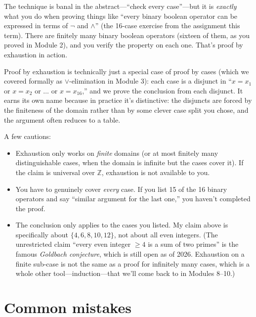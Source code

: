 \documentclass[11pt]{article}
\begin{document}
The technique is banal in the abstract---``check every case''---but it is \emph{exactly} what you do when proving things like ``every binary boolean operator can be expressed in terms of $\lnot$ and $\wedge$'' (the 16-case exercise from the assignment this term). There are finitely many binary boolean operators (sixteen of them, as you proved in Module 2), and you verify the property on each one. That's proof by exhaustion in action.

Proof by exhaustion is technically just a special case of proof by cases (which we covered formally as $\vee$-elimination in Module 3): each case is a disjunct in ``$x = x_1$ or $x = x_2$ or $\ldots$ or $x = x_{16}$,'' and we prove the conclusion from each disjunct. It earns its own name because in practice it's distinctive: the disjuncts are forced by the finiteness of the domain rather than by some clever case split you chose, and the argument often reduces to a table.

A few cautions:
\begin{itemize}
  \item Exhaustion only works on \emph{finite} domains (or at most finitely many distinguishable cases, when the domain is infinite but the cases cover it). If the claim is universal over $\mathbb{Z}$, exhaustion is not available to you.
  \item You have to genuinely cover \emph{every} case. If you list 15 of the 16 binary operators and say ``similar argument for the last one,'' you haven't completed the proof.
  \item The conclusion only applies to the cases you listed. My claim above is specifically about $\{4, 6, 8, 10, 12\}$, not about all even integers. (The unrestricted claim ``every even integer $\geq 4$ is a sum of two primes'' is the famous \emph{Goldbach conjecture}, which is still open as of 2026. Exhaustion on a finite sub-case is not the same as a proof for infinitely many cases, which is a whole other tool---induction---that we'll come back to in Modules 8--10.)
\end{itemize}

\section{Common mistakes}
\end{document}
